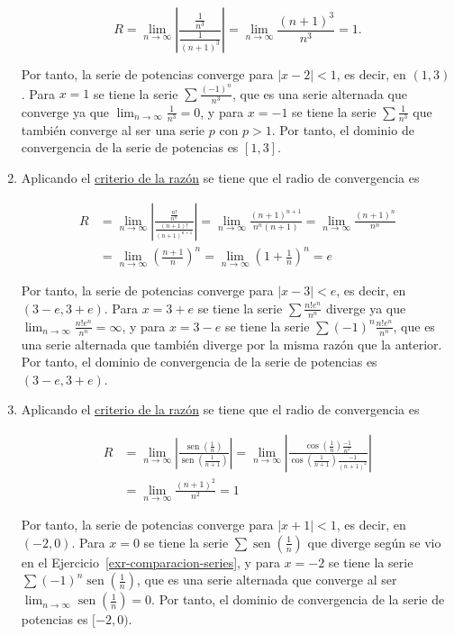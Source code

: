 \documentclass[
  a4paper,
]{scrreport}
\theoremstyle{definition}
\theoremstyle{remark}
\begin{document}
\begin{tcolorbox}
\begin{enumerate}
  \[
   R = \lim_{n\to\infty} \left|\frac{\frac{1}{n^3}}{\frac{1}{(n+1)^3}}\right| = \lim_{n\to\infty} \frac{(n+1)^3}{n^3} = 1.
   \]

  Por tanto, la serie de potencias converge para \(|x-2|<1\), es decir,
  en \((1,3)\). Para \(x=1\) se tiene la serie
  \(\sum \frac{(-1)^n}{n^3}\), que es una serie alternada que converge
  ya que \(\lim_{n\to\infty} \frac{1}{n^3} = 0\), y para \(x=-1\) se
  tiene la serie \(\sum \frac{1}{n^3}\) que también converge al ser una
  serie \(p\) con \(p>1\). Por tanto, el dominio de convergencia de la
  serie de potencias es \([1,3]\).
\item
  Aplicando el
  \href{https://aprendeconalf.es/analisis-manual/08-series.html\#thm-radio-convergencia-raiz}{criterio
  de la razón} se tiene que el radio de convergencia es

  \begin{align*}
   R &= \lim_{n\to\infty} \left|\frac{\frac{n!}{n^n}}{\frac{(n+1)!}{(n+1)^{n+1}}}\right| = \lim_{n\to\infty} \frac{(n+1)^{n+1}}{n^n (n+1)} = \lim_{n\to\infty} \frac{(n+1)^n}{n^n }\\
   & = \lim_{n\to\infty} \left(\frac{n+1}{n}\right)^n = \lim_{n\to\infty} \left(1+\frac{1}{n}\right)^n = e
   \end{align*}

  Por tanto, la serie de potencias converge para \(|x-3|<e\), es decir,
  en \((3-e,3+e)\). Para \(x=3+e\) se tiene la serie
  \(\sum \frac{n!e^n}{n^n}\) diverge ya que
  \(\lim_{n\to\infty} \frac{n!e^n}{n^n}=\infty\), y para \(x=3-e\) se
  tiene la serie \(\sum (-1)^n\frac{n!e^n}{n^n}\), que es una serie
  alternada que también diverge por la misma razón que la anterior. Por
  tanto, el dominio de convergencia de la serie de potencias es
  \((3-e,3+e)\).
\item
  Aplicando el
  \href{https://aprendeconalf.es/analisis-manual/08-series.html\#thm-radio-convergencia-raiz}{criterio
  de la razón} se tiene que el radio de convergencia es

  \begin{align*}
   R &= \lim_{n\to\infty} \left|\frac{\operatorname{sen}\left(\frac{1}{n}\right)}{\operatorname{sen}\left(\frac{1}{n+1}\right)}\right| 
   = \lim_{n\to\infty} \left|\frac{\cos\left(\frac{1}{n}\right)\frac{-1}{n^2}}{\cos\left(\frac{1}{n+1}\right)\frac{-1}{(n+1)^2}}\right| \tag{L'Hôpital}\\
   & = \lim_{n\to\infty} \frac{(n+1)^2}{n^2} 
   = 1
   \end{align*}

  Por tanto, la serie de potencias converge para \(|x+1|<1\), es decir,
  en \((-2,0)\). Para \(x=0\) se tiene la serie
  \(\sum \operatorname{sen}\left(\frac{1}{n}\right)\) que diverge según
  se vio en el Ejercicio~\ref{exr-comparacion-series}, y para \(x=-2\)
  se tiene la serie
  \(\sum (-1)^n\operatorname{sen}\left(\frac{1}{n}\right)\), que es una
  serie alternada que converge al ser
  \(\lim_{n\to\infty} \operatorname{sen}\left(\frac{1}{n}\right)=0\).
  Por tanto, el dominio de convergencia de la serie de potencias es
  \([-2,0)\).
\end{enumerate}

\end{tcolorbox}
\end{document}
